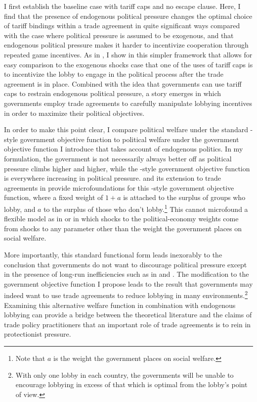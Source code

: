 I first establish the baseline case with tariff caps and no escape clause. Here, I find that the presence of endogenous political pressure changes the optimal choice of tariff bindings within a trade agreement in quite significant ways compared with the case where political pressure is assumed to be exogenous, and that endogenous political pressure makes it harder to incentivize cooperation through repeated game incentives. As in \Textcite{mrc2007}, I show in this simpler framework that allows for easy comparison to the exogenous shocks case that one of the uses of tariff caps is to incentivize the lobby to engage in the political process after the trade agreement is in place. Combined with the idea that governments can use tariff caps to restrain endogenous political pressure, a story emerges in which governments employ trade agreements to carefully manipulate lobbying incentives in order to maximize their political objectives.

In order to make this point clear, I compare political welfare under the standard \Textcite{baldwin}-style government objective function to political welfare under the government objective function I introduce that takes account of endogenous politics. In my formulation, the government is not necessarily always better off as political pressure climbs higher and higher, while the \Textcite{baldwin}-style  government objective function is everywhere increasing in political pressure. \Textcite{gh94} and its extension to trade agreements in \Textcite{gh95} provide microfoundations for this \Textcite{baldwin}-style government objective function, where a fixed weight of $1+a$ is attached to the surplus of groups who lobby, and $a$ to the surplus of those who don't lobby.\footnote{Note that $a$ is the weight the government places on social welfare.} This cannot microfound a flexible model as in \Textcite{longvousden} or in which shocks to the political-economy weights come from shocks to any parameter other than the weight the government places on social welfare.

More importantly, this standard functional form leads inexorably to the conclusion that governments do not want to discourage political pressure except in the presence of long-run inefficiencies such as in \Textcite{mitra} and \Textcite{mrc2007}. The modification to the government objective function I propose leads to the result that governments may indeed want to use trade agreements to reduce lobbying in many environments.\footnote{With only one lobby in each country, the governments will be unable to encourage lobbying in excess of that which is optimal from the lobby's point of view.} Examining this alternative welfare function in combination with endogenous lobbying can provide a bridge between the theoretical literature and the claims of trade policy practitioners that an important role of trade agreements is to rein in protectionist pressure.

